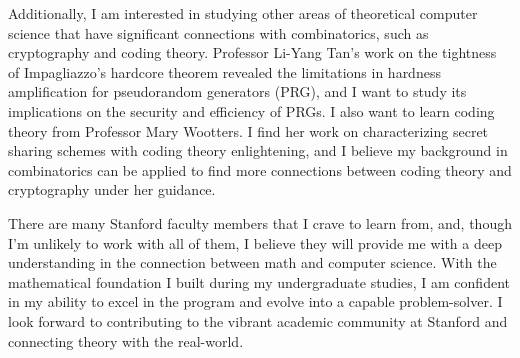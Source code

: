 \documentclass[12pt]{article}
\begin{document}
Additionally, I am interested in studying other areas of theoretical computer science that have
significant connections with combinatorics, such as cryptography and coding theory. Professor
Li-Yang Tan's work on the tightness of Impagliazzo's hardcore theorem
\cite{blanc2024samplecomplexitysmoothboosting} revealed the limitations in hardness amplification
for pseudorandom generators (PRG), and I want to study its implications on the security and
efficiency of PRGs. I also want to learn coding theory from Professor Mary Wootters. I find her work
on characterizing secret sharing schemes with coding
theory\cite{blackwell2023characterizationoptimalratelinearhomomorphic} enlightening, and I believe
my background in combinatorics can be applied to find more connections between coding theory and
cryptography under her guidance.

There are many Stanford faculty members that I crave to learn from, and, though I'm unlikely to work
with all of them, I believe they will provide me with a deep understanding in the connection between
math and computer science. With the mathematical foundation I built during my undergraduate studies,
I am confident in my ability to excel in the program and evolve into a capable problem-solver. I
look forward to contributing to the vibrant academic community at Stanford and connecting theory
with the real-world.

\newpage



\end{document}
